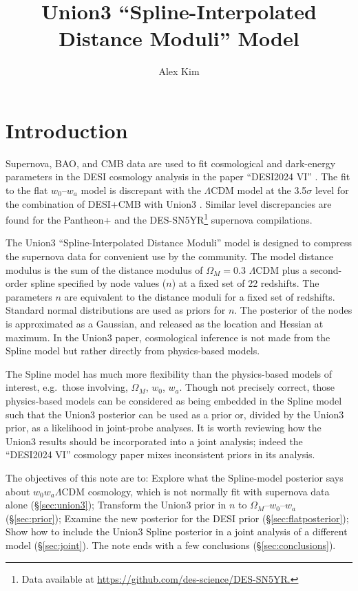 \documentclass[11pt,a4paper]{article}
\title{Union3 ``Spline-Interpolated Distance Moduli'' Model}
\author[a]{Alex Kim}
\affiliation[a]{Lawrence Berkeley National Laboratory}
\begin{document}
\maketitle

\section{Introduction}
Supernova, BAO, and CMB data are used to fit cosmological and dark-energy parameters in the DESI cosmology
analysis in the paper ``DESI2024 VI''  \citep{2024arXiv240403002D}.  The fit to the flat $w_0$--$w_a$ model is discrepant with the $\Lambda$CDM
model at the 3.5$\sigma$ level for the combination of DESI+CMB with Union3  \cite{2023arXiv231112098R}.
Similar level discrepancies are found for the Pantheon+ \cite{2022ApJ...938..113S} and the DES-SN5YR\footnote{Data available at \url{https://github.com/des-science/DES-SN5YR.}} supernova compilations.

The Union3 ``Spline-Interpolated Distance Moduli'' model is designed to compress the  supernova data for convenient use by the community.  
The  model distance modulus
is the sum of the distance modulus of $\Omega_M=0.3$  $\Lambda$CDM plus a second-order spline specified by node values ($n$)
at a fixed set of 22 redshifts. 
The parameters $n$ are equivalent to the distance moduli for a fixed set of redshifts.
Standard normal distributions are used as priors for $n$.  
The posterior of the nodes is approximated as a Gaussian, and released as the location and Hessian at maximum.
In the Union3 paper, cosmological inference is not made from the Spline model but rather directly from physics-based models.

The Spline model has much more flexibility than the physics-based models of interest, e.g.\ those involving, $\Omega_M$,
$w_0$, $w_a$.  Though not precisely correct, those physics-based models can be considered as being embedded in the Spline
model such that the Union3  posterior can  be used as a prior or, divided by the Union3 prior, as a likelihood in joint-probe analyses.   It is worth reviewing
how the Union3 results should be incorporated into a joint analysis; indeed the ``DESI2024 VI''
cosmology paper  \cite{2024arXiv240403002D} mixes inconsistent priors in its analysis.

The objectives of this note are to: Explore what the Spline-model posterior says about $w_0w_a\Lambda$CDM cosmology, which is not normally
fit with  supernova data alone (\S\ref{sec:union3}); Transform the Union3 prior in $n$ to $\Omega_M$--$w_0$--$w_a$
(\S\ref{sec:prior});
Examine the new posterior for the DESI prior
(\S\ref{sec:flatposterior}); Show how to include the Union3 Spline posterior in a joint analysis of a different model (\S\ref{sec:joint}).
The note ends with a few conclusions (\S\ref{sec:conclusions}).
\end{document}
